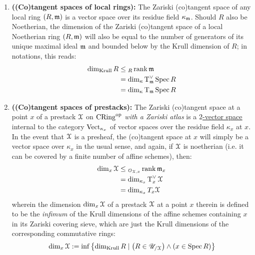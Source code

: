             \begin{proposition} \label{prop: Zariski_tangent_spaces_are_vector_spaces} 
                \noindent
                \begin{enumerate}
                    \item \textbf{\textbf{((Co)tangent spaces of local rings):}} The Zariski (co)tangent space of any local ring $(R, \mathfrak{m})$ is a vector space over its residue field $\kappa_{\mathfrak{m}}$. Should $R$ also be Noetherian, the dimension of the Zariski (co)tangent space of a local Noetherian ring $(R, \mathfrak{m})$ will also be equal to the number of generators of its unique maximal ideal $\mathfrak{m}$ and bounded below by the Krull dimension of $R$; in notations, this reads:
                        $$
                            \begin{aligned}
                                \dim_{\mathrm{Krull}} R & \leq {}_R\operatorname{rank} \mathfrak{m}
                                \\
                                & = \dim_{\kappa} \operatorname{T}^{\vee}_{\mathfrak{m}} \operatorname{Spec} R
                                \\
                                & = \dim_{\kappa} \operatorname{T}_{\mathfrak{m}} \operatorname{Spec} R
                            \end{aligned}
                        $$
                    \item \textbf{((Co)tangent spaces of prestacks):} The Zariski (co)tangent space at a point $x$ of a prestack $\mathcal{X}$ on $\mathrm{CRing}^{\mathrm{op}}$ \textit{with a Zariski atlas} is a \href{https://ncatlab.org/nlab/show/2-vector+space}{\underline{$2$-vector space}} internal to the category $\mathrm{Vect}_{\kappa_x}$ of vector spaces over the residue field $\kappa_x$ at $x$. In the event that $\mathcal{X}$ is a presheaf, the (co)tangent space at $x$ will simply be a vector space over $\kappa_x$ in the usual sense, and again, if $\mathcal{X}$ is noetherian (i.e. it can be covered by a finite number of affine schemes), then:
                        $$
                            \begin{aligned}
                                \dim_x \mathcal{X} & \leq {}_{\mathcal{O}_{\mathcal{X}, x}}\operatorname{rank} \mathfrak{m}_x
                                \\
                                & = \dim_{\kappa_x} \operatorname{T}^{\vee}_x \mathcal{X}
                                \\
                                & = \dim_{\kappa_x} T_x \mathcal{X}
                            \end{aligned}
                        $$
                    wherein the dimension $\dim_x \mathcal{X}$ of a prestack $\mathcal{X}$ at a point $x$ therein is defined to be the \textit{infimum} of the Krull dimensions of the affine schemes containing $x$ in its Zariski covering sieve, which are just the Krull dimensions of the corresponding commutative rings:
                        $$\dim_x \mathcal{X} := \inf \left\{ \dim_{\mathrm{Krull}} R \mid \left(R \in \mathscr{U}_{/\mathcal{X}}\right) \wedge (x \in \operatorname{Spec} R) \right\}$$
                \end{enumerate}
            \end{proposition}
